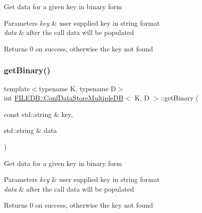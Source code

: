 Get data for a given key in binary form


\begin{DoxyParams}{Parameters}
{\em key} & user supplied key in string format \\
\hline
{\em data} & after the call data will be populated \\
\hline
\end{DoxyParams}
\begin{DoxyReturn}{Returns}
0 on success, otherwise the key not found 
\end{DoxyReturn}
\mbox{\label{classFILEDB_1_1ConfDataStoreMultipleDB_a56fefab208c1b4abc3139afb38035a13}} 
\subsubsection{\texorpdfstring{getBinary()}{getBinary()}\hspace{0.1cm}{\footnotesize\ttfamily [3/3]}}
{\footnotesize\ttfamily template$<$typename K, typename D$>$ \\
int \mbox{\hyperlink{classFILEDB_1_1ConfDataStoreMultipleDB}{F\+I\+L\+E\+D\+B\+::\+Conf\+Data\+Store\+Multiple\+DB}}$<$ K, D $>$\+::get\+Binary (\begin{DoxyParamCaption}\item[{const std\+::string \&}]{key,  }\item[{std\+::string \&}]{data }\end{DoxyParamCaption})\hspace{0.3cm}{\ttfamily [inline]}}

Get data for a given key in binary form


\begin{DoxyParams}{Parameters}
{\em key} & user supplied key in string format \\
\hline
{\em data} & after the call data will be populated \\
\hline
\end{DoxyParams}
\begin{DoxyReturn}{Returns}
0 on success, otherwise the key not found 
\end{DoxyReturn}
\mbox{\label{classFILEDB_1_1ConfDataStoreMultipleDB_adb7a350dc85ad9c3830e98a0f03b68d7}} 
